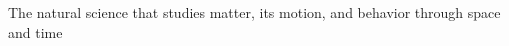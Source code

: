 \documentclass[preview]{standalone}
\begin{document}
\begin{center}
The natural science that studies matter, its motion, and behavior through space and time
\end{center}
\end{document}

